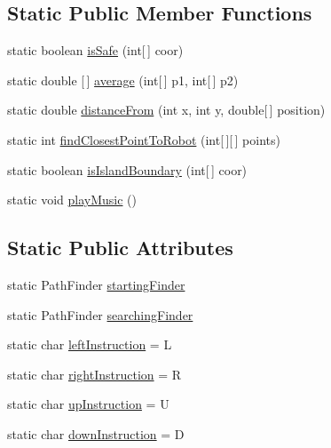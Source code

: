 \subsection*{Static Public Member Functions}
\begin{DoxyCompactItemize}
\item 
static boolean \hyperlink{classca_1_1mcgill_1_1ecse211_1_1project_1_1_game_util_a4b657445545fb1a814b6699724d72042}{is\+Safe} (int\mbox{[}$\,$\mbox{]} coor)
\item 
static double \mbox{[}$\,$\mbox{]} \hyperlink{classca_1_1mcgill_1_1ecse211_1_1project_1_1_game_util_ae5c5c445ab84516991219ca3783fcaa4}{average} (int\mbox{[}$\,$\mbox{]} p1, int\mbox{[}$\,$\mbox{]} p2)
\item 
static double \hyperlink{classca_1_1mcgill_1_1ecse211_1_1project_1_1_game_util_a6fb324a3d5e42414c83dfd8bd5910b56}{distance\+From} (int x, int y, double\mbox{[}$\,$\mbox{]} position)
\item 
static int \hyperlink{classca_1_1mcgill_1_1ecse211_1_1project_1_1_game_util_a6e0ee94b800ca3727ca8009782abda14}{find\+Closest\+Point\+To\+Robot} (int\mbox{[}$\,$\mbox{]}\mbox{[}$\,$\mbox{]} points)
\item 
static boolean \hyperlink{classca_1_1mcgill_1_1ecse211_1_1project_1_1_game_util_a5783c3415e13b66362a647504b63741a}{is\+Island\+Boundary} (int\mbox{[}$\,$\mbox{]} coor)
\item 
static void \hyperlink{classca_1_1mcgill_1_1ecse211_1_1project_1_1_game_util_a38f0e4fdf048d1c265a4b5fc712588f3}{play\+Music} ()
\end{DoxyCompactItemize}
\subsection*{Static Public Attributes}
\begin{DoxyCompactItemize}
\item 
static Path\+Finder \hyperlink{classca_1_1mcgill_1_1ecse211_1_1project_1_1_game_util_a84ec23eabf60cb20895815e7b390e3f2}{starting\+Finder}
\item 
static Path\+Finder \hyperlink{classca_1_1mcgill_1_1ecse211_1_1project_1_1_game_util_acedc99ad369450d6b2d7711c2d63027a}{searching\+Finder}
\item 
static char \hyperlink{classca_1_1mcgill_1_1ecse211_1_1project_1_1_game_util_ab171328c45ccc1d98d96cc9422232669}{left\+Instruction} = \textquotesingle{}L\textquotesingle{}
\item 
static char \hyperlink{classca_1_1mcgill_1_1ecse211_1_1project_1_1_game_util_a4f6944d94b8de443baa150a2e7b700a0}{right\+Instruction} = \textquotesingle{}R\textquotesingle{}
\item 
static char \hyperlink{classca_1_1mcgill_1_1ecse211_1_1project_1_1_game_util_a98831b92dc6ed43627755d2995cba683}{up\+Instruction} = \textquotesingle{}U\textquotesingle{}
\item 
static char \hyperlink{classca_1_1mcgill_1_1ecse211_1_1project_1_1_game_util_afc9ecf0a8a18c0abea79086801d8425a}{down\+Instruction} = \textquotesingle{}D\textquotesingle{}
\end{DoxyCompactItemize}


